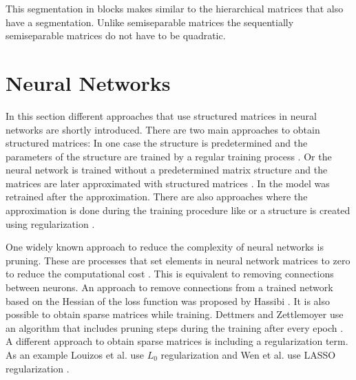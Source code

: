 \documentclass[numbers=noenddot,doctype=mastersthesis,BCOR=15mm,biblatex]{ldvbook}%
\begin{document}
This segmentation in blocks makes similar to the hierarchical matrices that also have a segmentation.
Unlike semiseparable matrices the sequentially semiseparable matrices do not have to be quadratic. 

\section{Neural Networks}\label{sec:AI_weight}
In this section different approaches that use structured matrices in neural networks are shortly introduced.
There are two main approaches to obtain structured matrices:
In one case the structure is predetermined and the parameters of the structure are trained by a regular training process \cite{fan_multiscale_2019,dao_kaleidoscope_2020,li_butterfly_2015,ailon_sparse_2021,ioannou_training_2016}.
Or the neural network is trained without a predetermined matrix structure and the matrices are later approximated with structured matrices \cite{wu_hybrid_2020,hassibi_optimal_1993,jaderberg_speeding_2014,rigamonti_learning_2013}. In \cite{yu_compressing_2017} the model was retrained after the approximation. 
There are also approaches where the approximation is done during the training procedure like \cite{dettmers_sparse_2019} or a structure is created using regularization \cite{louizos_learning_2018,wen_learning_2016}.


One widely known approach to reduce the complexity of neural networks is pruning. 
These are processes that set elements in neural network matrices to zero to reduce the computational cost \cite{blalock_what_2020}.
This is equivalent to removing connections between neurons.
An approach to remove connections from a trained network based on the Hessian of the loss function was proposed by Hassibi \cite{hassibi_optimal_1993}.
It is also possible to obtain sparse matrices while training.
Dettmers and Zettlemoyer use an algorithm that includes pruning steps during the training after every epoch \cite{dettmers_sparse_2019}.
A different approach to obtain sparse matrices is including a regularization term.
As an example Louizos et al. use $L_0$ regularization  \cite{louizos_learning_2018} and Wen et al. use LASSO regularization \cite{wen_learning_2016}.
\end{document}
